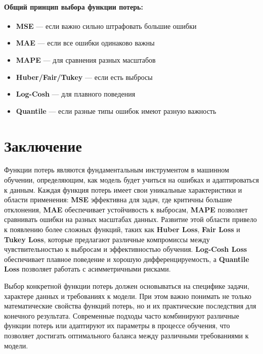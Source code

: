 \paragraph{Общий принцип выбора функции потерь:}

\begin{itemize}
    \item \textbf{MSE} — если важно сильно штрафовать большие ошибки
    \item \textbf{MAE} — если все ошибки одинаково важны
    \item \textbf{MAPE} — для сравнения разных масштабов
    \item \textbf{Huber/Fair/Tukey} — если есть выбросы
    \item \textbf{Log-Cosh} — для плавного поведения
    \item \textbf{Quantile} — если разные типы ошибок имеют разную важность
\end{itemize}



\section{Заключение}

Функции потерь являются фундаментальным инструментом в машинном обучении, определяющим, как модель будет учиться на ошибках и адаптироваться к данным. Каждая функция потерь имеет свои уникальные характеристики и области применения: \textbf{MSE} эффективна для задач, где критичны большие отклонения, \textbf{MAE} обеспечивает устойчивость к выбросам, \textbf{MAPE} позволяет сравнивать ошибки на разных масштабах данных. Развитие этой области привело к появлению более сложных функций, таких как \textbf{Huber Loss}, \textbf{Fair Loss} и \textbf{Tukey Loss}, которые предлагают различные компромиссы между чувствительностью к выбросам и эффективностью обучения. \textbf{Log-Cosh Loss} обеспечивает плавное поведение и хорошую дифференцируемость, а \textbf{Quantile Loss} позволяет работать с асимметричными рисками. 

Выбор конкретной функции потерь должен основываться на специфике задачи, характере данных и требованиях к модели. При этом важно понимать не только математические свойства функций потерь, но и их практические последствия для конечного результата. Современные подходы часто комбинируют различные функции потерь или адаптируют их параметры в процессе обучения, что позволяет достигать оптимального баланса между различными требованиями к модели.




